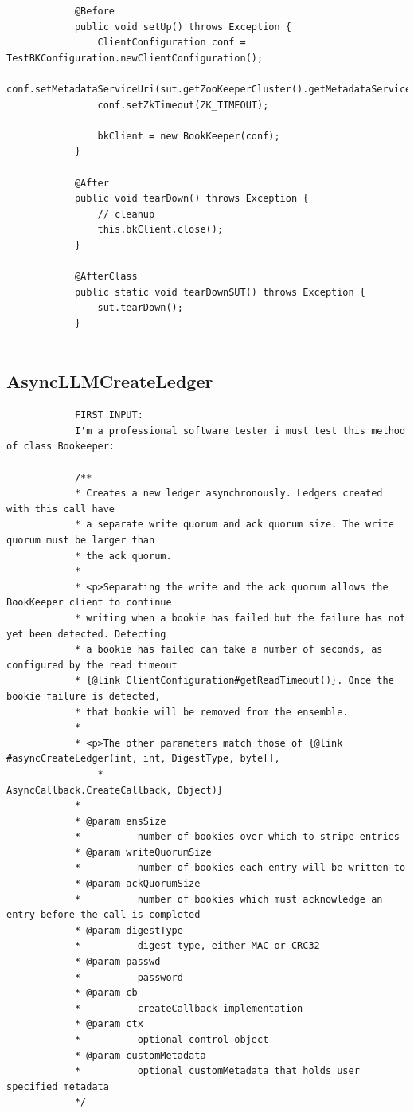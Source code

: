 \documentclass[10pt]{article}
\begin{document}
{\begin{verbatim}
			@Before
			public void setUp() throws Exception {
				ClientConfiguration conf = TestBKConfiguration.newClientConfiguration();
				conf.setMetadataServiceUri(sut.getZooKeeperCluster().getMetadataServiceUri());
				conf.setZkTimeout(ZK_TIMEOUT);
				
				bkClient = new BookKeeper(conf);
			}
			
			@After
			public void tearDown() throws Exception {
				// cleanup
				this.bkClient.close();
			}
			
			@AfterClass
			public static void tearDownSUT() throws Exception {
				sut.tearDown();
			}
			
		\end{verbatim}
		\subsection{AsyncLLMCreateLedger}
		\label{subsec:AsyncLLMCreateLedger}
		\begin{verbatim}
			FIRST INPUT:
			I'm a professional software tester i must test this method of class Bookeeper:
			
			/**
			* Creates a new ledger asynchronously. Ledgers created with this call have
			* a separate write quorum and ack quorum size. The write quorum must be larger than
			* the ack quorum.
			*
			* <p>Separating the write and the ack quorum allows the BookKeeper client to continue
			* writing when a bookie has failed but the failure has not yet been detected. Detecting
			* a bookie has failed can take a number of seconds, as configured by the read timeout
			* {@link ClientConfiguration#getReadTimeout()}. Once the bookie failure is detected,
			* that bookie will be removed from the ensemble.
			*
			* <p>The other parameters match those of {@link #asyncCreateLedger(int, int, DigestType, byte[],
				*                                      AsyncCallback.CreateCallback, Object)}
			*
			* @param ensSize
			*          number of bookies over which to stripe entries
			* @param writeQuorumSize
			*          number of bookies each entry will be written to
			* @param ackQuorumSize
			*          number of bookies which must acknowledge an entry before the call is completed
			* @param digestType
			*          digest type, either MAC or CRC32
			* @param passwd
			*          password
			* @param cb
			*          createCallback implementation
			* @param ctx
			*          optional control object
			* @param customMetadata
			*          optional customMetadata that holds user specified metadata
			*/
			

\end{verbatim}}
\end{document}
